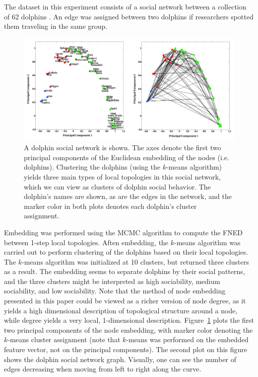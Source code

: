 \documentclass{article}
\begin{document}
The dataset in this experiment consists of a social network between a collection of 62 dolphins \cite{bottleNoseDolphinPeople}. An edge was assigned between two dolphins if researchers spotted them traveling in the same group.
\begin{figure}[!]
  \centering               
  \includegraphics[width=1\textwidth]{../img/demo5_dolphinSocialNetwork/dolphinFigure.pdf}
  \caption{A dolphin social network is shown. The axes denote the first two principal components of the Euclidean embedding of the nodes (i.e. dolphins). Clustering the dolphins (using the $k$-means algorithm) yields three main types of local topologies in this social network, which we can view as clusters of dolphin social behavior. The dolphin's names are shown, as are the edges in the network, and the marker color in both plots denotes each dolphin's cluster assignment.}
  \label{fig:dolphinSocialNetwork}
\end{figure}

Embedding was performed using the MCMC algorithm to compute the FNED between 1-step local topologies. Aften embedding, the $k$-means algorithm was carried out to perform clustering of the dolphins based on their local topologies. The $k$-means algorithm was initialized at 10 clusters, but returned three clusters as a result. The embedding seems to separate dolphins by their social patterns, and the three clusters might be interpreted as high sociability, medium sociability, and low sociability. Note that the method of node embedding presented in this paper could be viewed as a richer version of node degree, as it yields a high dimensional description of topological structure around a node, while degree yields a very local, 1-dimensional description. Figure~\ref{fig:dolphinSocialNetwork} plots the first two principal components of the node embedding, with marker color denoting the $k$-means cluster assignment (note that $k$-means was performed on the embedded feature vector, not on the principal components). The second plot on this figure shows the dolphin social network graph. Visually, one can see the number of edges decreasing when moving from left to right along the curve.
\end{document}

